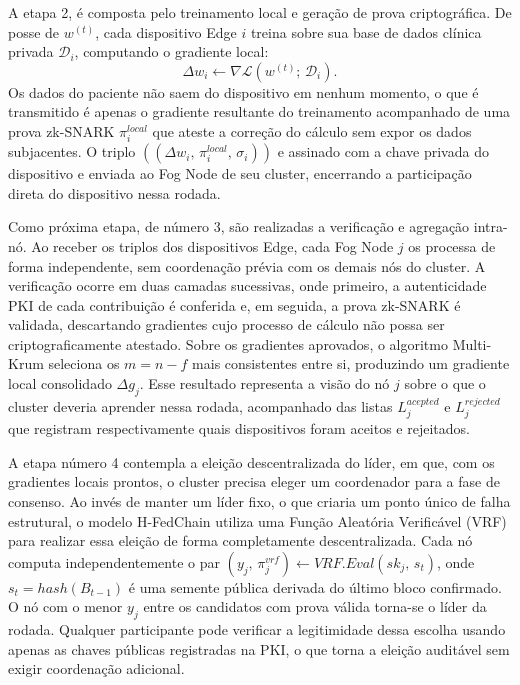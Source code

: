 \documentclass[12pt]{article}
\begin{document}
A etapa 2, é composta pelo treinamento local e geração de prova criptográfica. De posse de $w^{(t)}$, cada dispositivo Edge $i$ treina sobre sua base de dados clínica privada $\mathcal{D}_i$, computando o gradiente local:
\[
\Delta w_i \leftarrow \nabla\mathcal{L}(w^{(t)};\, \mathcal{D}_i).
\]
Os dados do paciente não saem do dispositivo em nenhum momento, o que é transmitido é apenas o gradiente resultante do treinamento acompanhado de uma prova zk-SNARK $\pi_i^{local}$ que ateste a correção do cálculo sem expor os dados subjacentes. O triplo $((\Delta w_i,\, \pi_i^{{local}},\, \sigma_i))$ e assinado com a chave privada do dispositivo e enviada ao Fog Node de seu cluster, encerrando a participação direta do dispositivo nessa rodada.

Como próxima etapa, de número 3, são realizadas a verificação e agregação intra-nó. Ao receber os triplos dos dispositivos Edge, cada Fog Node $j$ os processa de forma independente, sem coordenação prévia com os demais nós do cluster. A verificação ocorre em duas camadas sucessivas, onde primeiro, a autenticidade PKI de cada contribuição é conferida e, em seguida, a prova zk-SNARK é validada, descartando gradientes cujo processo de cálculo não possa ser criptograficamente atestado. Sobre os gradientes aprovados, o algoritmo Multi-Krum seleciona os $m=n-f$ mais consistentes entre si, produzindo um gradiente local consolidado $\Delta g_j$. Esse resultado representa a visão do nó $j$ sobre o que o cluster deveria aprender nessa rodada, acompanhado das listas $L_j^{acepted}$ e $L_j^{rejected}$ que registram respectivamente quais dispositivos foram aceitos e rejeitados.

A etapa número 4 contempla a eleição descentralizada do líder, em que, com os gradientes locais prontos, o cluster precisa eleger um coordenador para a fase de consenso. Ao invés de manter um líder fixo, o que criaria um ponto único de falha estrutural, o modelo H-FedChain utiliza uma Função Aleatória Verificável (VRF) para realizar essa eleição de forma completamente descentralizada. Cada nó computa independentemente o par $(y_j,\, \pi_j^{{vrf}}) \leftarrow {VRF.Eval}(sk_j,\, s_t)$, onde $s_t = {hash}(B_{t-1})$ é uma semente pública derivada do último bloco confirmado. O nó com o menor $y_j$ entre os candidatos com prova válida torna-se o líder da rodada. Qualquer participante pode verificar a legitimidade dessa escolha usando apenas as chaves públicas registradas na PKI, o que torna a eleição auditável sem exigir coordenação adicional.
\end{document}
